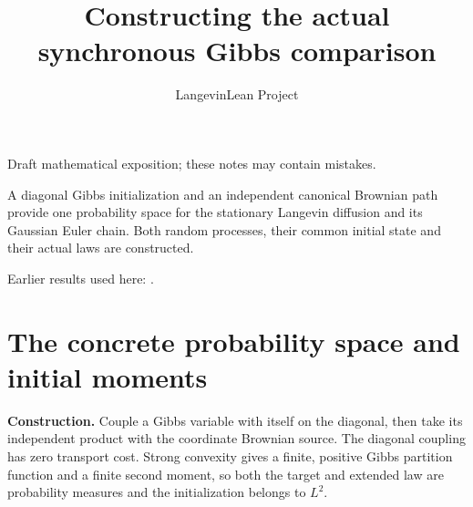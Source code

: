 \documentclass[11pt,a4paper]{article}
\title{\texorpdfstring{Constructing the actual synchronous Gibbs comparison}{Constructing the actual synchronous Gibbs comparison}}
\author{LangevinLean Project}
\date{}
\begin{document}
\maketitle
Draft mathematical exposition; these notes may contain mistakes.


A diagonal Gibbs initialization and an independent canonical Brownian path provide one probability space for the stationary Langevin diffusion and its Gaussian Euler chain. Both random processes, their common initial state and their actual laws are constructed.



Earlier results used here: \cite[Section~3.45]{LangevinLean2026ULASC}.

\section{\texorpdfstring{The concrete probability space and initial moments}{The concrete probability space and initial moments}}


\textbf{Construction.} Couple a Gibbs variable with itself on the diagonal, then take its independent product with the coordinate Brownian source. The diagonal coupling has zero transport cost. Strong convexity gives a finite, positive Gibbs partition function and a finite second moment, so both the target and extended law are probability measures and the initialization belongs to \(L^2\).
\end{document}
